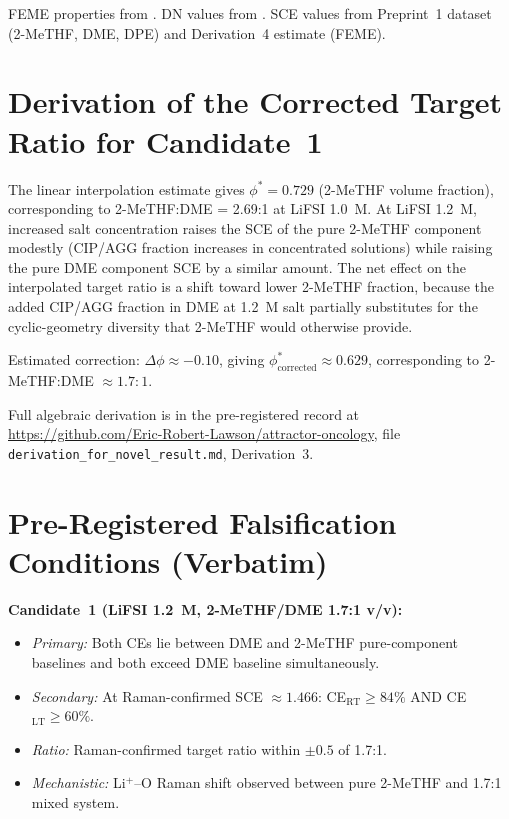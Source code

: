 \documentclass[11pt]{article}
\theoremstyle{plain}
\theoremstyle{definition}
\theoremstyle{remark}
\begin{document}
\noindent FEME properties from \cite{Wan2021,CRC2024}.
DN values from \cite{Gutmann1976}.
SCE values from Preprint~1 dataset (2-MeTHF, DME, DPE) and
Derivation~4 estimate (FEME).

\section{Derivation of the Corrected Target Ratio for Candidate~1}
\label{app:ratio_correction}

The linear interpolation estimate gives $\phi^{*} = 0.729$
(2-MeTHF volume fraction), corresponding to 2-MeTHF:DME = 2.69:1
at LiFSI 1.0~M.  At LiFSI 1.2~M, increased salt concentration
raises the SCE of the pure 2-MeTHF component modestly (CIP/AGG
fraction increases in concentrated solutions) while raising the
pure DME component SCE by a similar amount.  The net effect on the
interpolated target ratio is a shift toward lower 2-MeTHF fraction,
because the added CIP/AGG fraction in DME at 1.2~M salt partially
substitutes for the cyclic-geometry diversity that 2-MeTHF would
otherwise provide.

Estimated correction: $\Delta\phi \approx -0.10$, giving
$\phi^{*}_{\mathrm{corrected}} \approx 0.629$, corresponding to
2-MeTHF:DME $\approx 1.7:1$.

Full algebraic derivation is in the pre-registered record at
\url{https://github.com/Eric-Robert-Lawson/attractor-oncology},
file \texttt{derivation\_for\_novel\_result.md}, Derivation~3.

\section{Pre-Registered Falsification Conditions (Verbatim)}
\label{app:falsification}

\noindent\textbf{Candidate~1 (LiFSI 1.2~M, 2-MeTHF/DME 1.7:1 v/v):}
\begin{itemize}[leftmargin=2em]
  \item \textit{Primary:} Both CEs lie between DME and 2-MeTHF
        pure-component baselines and both exceed DME baseline
        simultaneously.
  \item \textit{Secondary:} At Raman-confirmed SCE $\approx 1.466$:
        CE$_\mathrm{RT} \geq 84\%$ AND CE$_\mathrm{LT} \geq 60\%$.
  \item \textit{Ratio:} Raman-confirmed target ratio within $\pm 0.5$
        of 1.7:1.
  \item \textit{Mechanistic:} Li$^+$--O Raman shift observed
        between pure 2-MeTHF and 1.7:1 mixed system.
\end{itemize}
\end{document}
